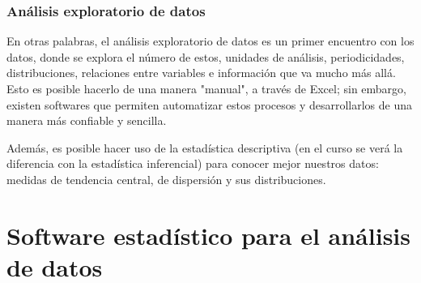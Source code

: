 \documentclass{libs/XJTLU_format}
\begin{document}

\begin{frame}[fragile] 
    \frametitle{Análisis exploratorio de datos}
    \begin{center}
        En otras palabras, el análisis exploratorio de datos es un primer encuentro con los datos, donde se explora el número de estos, unidades de análisis, periodicidades, distribuciones, relaciones entre variables e información que va mucho más allá.  Esto es posible hacerlo de una manera "manual", a través de Excel; sin embargo, existen softwares que permiten automatizar estos procesos y desarrollarlos de una manera más confiable y sencilla.\newline 
    \end{center}
    
    \begin{center}    
        Además, es posible hacer uso de la estadística descriptiva (en el curso se verá la diferencia con la estadística inferencial) para conocer mejor nuestros datos: medidas de tendencia central, de dispersión y sus distribuciones. 
    \end{center}

\end{frame}

\section{Software estadístico para el análisis de datos}
\end{document}
